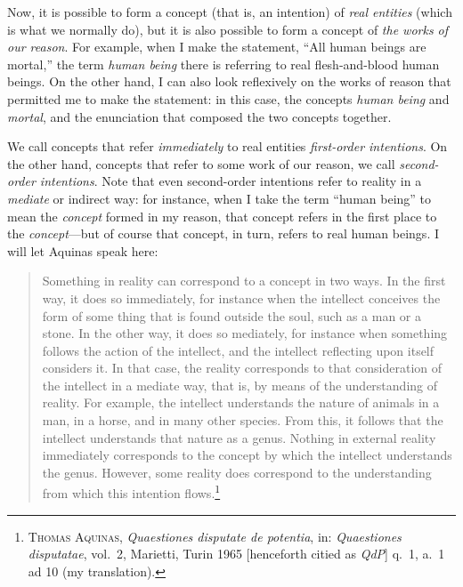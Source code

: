 \documentclass[
  12pt,
]{memoir}
\begin{document}
Now, it is possible to form a concept (that is, an intention) of
\emph{real entities} (which is what we normally do), but it is also
possible to form a concept of \emph{the works of our reason}. For
example, when I make the statement, ``All human beings are mortal,'' the
term \emph{human being} there is referring to real flesh-and-blood human
beings. On the other hand, I can also look reflexively on the works of
reason that permitted me to make the statement: in this case, the
concepts \emph{human being} and \emph{mortal}, and the enunciation that
composed the two concepts together.

We call concepts that refer \emph{immediately} to real entities
\emph{first-order intentions}. On the other hand, concepts that refer to
some work of our reason, we call \emph{second-order intentions}. Note
that even second-order intentions refer to reality in a \emph{mediate}
or indirect way: for instance, when I take the term ``human being'' to
mean the \emph{concept} formed in my reason, that concept refers in the
first place to the \emph{concept}---but of course that concept, in turn,
refers to real human beings. I will let Aquinas speak here:

\begin{quote}
Something in reality can correspond to a concept in two ways. In the
first way, it does so immediately, for instance when the intellect
conceives the form of some thing that is found outside the soul, such as
a man or a stone. In the other way, it does so mediately, for instance
when something follows the action of the intellect, and the intellect
reflecting upon itself considers it. In that case, the reality
corresponds to that consideration of the intellect in a mediate way,
that is, by means of the understanding of reality. For example, the
intellect understands the nature of animals in a man, in a horse, and in
many other species. From this, it follows that the intellect understands
that nature as a genus. Nothing in external reality immediately
corresponds to the concept by which the intellect understands the genus.
However, some reality does correspond to the understanding from which
this intention flows.\footnote{\textsc{Thomas Aquinas},
  \emph{Quaestiones disputate de potentia}, in: \emph{Quaestiones
  disputatae}, vol.~2, Marietti, Turin 1965 {[}henceforth citied as
  \emph{QdP}{]} q.~1, a.~1 ad 10 (my translation).}
\end{quote}
\end{document}
